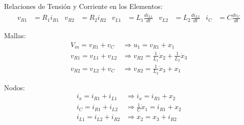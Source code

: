   Relaciones de Tensión y Corriente en los Elementos:
  \begin{align*}
    v_{R1} &= R_1 i_{R1} &
    v_{R2} &= R_2 i_{R2} &
    v_{L1} &= L_1 \frac{di_{L1}}{dt} &
    v_{L2} &= L_2 \frac{di_{L2}}{dt} &
    i_C &= C \frac{dv_{C}}{dt}
  \end{align*}

  Mallas:
  \begin{align*}
    \tag{Malla 1}
    V_{in} = v_{R1} + v_C &\Rightarrow u_1 = v_{R1} + x_1 \\
    \tag{Malla 2}
    v_{R1} = v_{L1} + v_{L2} &\Rightarrow v_{R2} = \frac{1}{L_1}\dot{x}_2 + \frac{1}{L_2}\dot{x}_3 \\
    \tag{Malla 3}
    v_{R2} = v_{L2} + v_C &\Rightarrow v_{R2} = \frac{1}{L_2}\dot{x}_3 + x_1
  \end{align*}

  Nodos:
  \begin{align*}
    \tag{Nodo 1}
    i_x = i_{R1} + i_{L1} &\Rightarrow i_x = i_{R1} + x_2 \\
    \tag{Nodo 2}
    i_C = i_{R1} + i_{L2} &\Rightarrow \frac{1}{C}\dot{x}_1 = i_{R1} + x_2 \\
    \tag{Nodo $V_x$}
    i_{L1} = i_{L2} + i_{R2} &\Rightarrow x_2 = x_3 + i_{R2}
  \end{align*}
